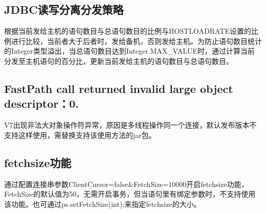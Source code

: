 \documentclass[a4,10pt,oneside,english]{sphinxmanual}
\begin{document}
\begin{sphinxVerbatim}[commandchars=\\\{\}]
\PYG{p}{[} \PYG{p}{]} \PYG{p}{[}\PYG{p}{]} \PYG{p}{[}\PYG{p}{]}      \PYG{p}{[} \PYG{p}{]}         
\end{sphinxVerbatim}


\subsection{JDBC读写分离分发策略}
\label{\detokenize{interface/jdbc-v7:id2}}
根据当前发给主机的语句数目与总语句数目的比例与HOSTLOADRATE设置的比例进行比较，当前者大于后者时，发给备机，否则发给主机。为防止语句数目统计的Integer类型溢出，当总语句数目达到Integer.MAX\_VALUE时，通过计算当前分发至主机语句的百分比，更新当前发给主机的语句数目与总语句数目。


\subsection{FastPath call returned invalid large object descriptor：0.}
\label{\detokenize{interface/jdbc-v7:fastpath-call-returned-invalid-large-object-descriptor-0}}
V7出现非法大对象操作符异常，原因是多线程操作同一个连接，默认发布版本不支持这样使用，需替换支持该使用方法的jar包。


\subsection{fetchsize功能}
\label{\detokenize{interface/jdbc-v7:fetchsize}}
通过配置连接串参数ClientCursor=false\&FetchSize=10000开启fetchsize功能，FetchSize的默认值为50，无需开启事务，但当语句里有绑定参数时，不支持使用该功能。也可通过ps.setFetchSize(int);来指定fetchsize的大小。
\end{document}

